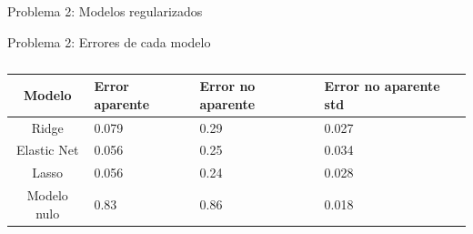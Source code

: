 \documentclass[notheorems]{beamer}
\begin{document}
\begin{frame}{Problema 2: Modelos regularizados}
    \begin{table}[htbp]
        \begin{center}
        \caption{Errores por validación cruzada}
        \label{tabla:MS}
        \end{center}
    \end{table}
\end{frame}
\begin{frame}{Problema 2: Errores de cada modelo}
    \begin{table}[htbp]
        \begin{center}
        \begin{tabular}{c|p{1.5cm}|p{1.5cm}|p{1.5cm}}
        \toprule
        Modelo       &  Error aparente  &  Error no aparente  & Error no aparente std  \\ 
        \midrule
        Ridge        &     0.079      &      0.29       &  0.027  \\
        Elastic Net   &     0.056      &      0.25       &  0.034  \\
        Lasso        &     0.056      &      0.24       &  0.028  \\
        Modelo nulo  &     0.83       &      0.86       &  0.018  \\
        \bottomrule
        \end{tabular}
        \caption{}
        \label{tabla:ME}
        \end{center}
    \end{table}
\end{frame}
\end{document}
